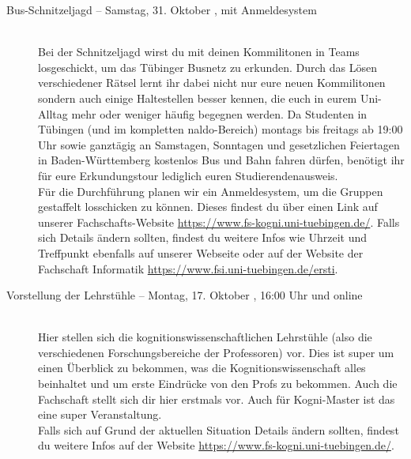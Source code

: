 \begin{description}
\ifkogwiss
\item[Bus-Schnitzeljagd -- Samstag, 31. Oktober \YEAR, mit Anmeldesystem]\ \\
    Bei der Schnitzeljagd wirst du mit deinen Kommilitonen in Teams losgeschickt, um das Tübinger Busnetz zu erkunden. Durch das Lösen verschiedener Rätsel lernt ihr dabei nicht nur eure neuen Kommilitonen sondern auch einige Haltestellen besser kennen, die euch in eurem Uni-Alltag mehr oder weniger häufig begegnen werden. Da Studenten in Tübingen (und im kompletten naldo-Bereich) montags bis freitags ab 19:00 Uhr sowie ganztägig an Samstagen, Sonntagen und gesetzlichen Feiertagen in Baden-Württemberg kostenlos Bus und Bahn fahren dürfen, benötigt ihr für eure Erkundungstour lediglich euren Studierendenausweis.\\
    Für die Durchführung planen wir ein Anmeldesystem, um die Gruppen gestaffelt losschicken zu können. Dieses findest du über einen Link auf unserer Fachschafts-Website \url{https://www.fs-kogni.uni-tuebingen.de/}.
    Falls sich Details ändern sollten, findest du weitere Infos wie Uhrzeit und Treffpunkt ebenfalls auf unserer Webseite oder auf der Website der Fachschaft Informatik \url{https://www.fsi.uni-tuebingen.de/ersti}.\\
\fi

\ifkogwiss
\item[Vorstellung der Lehrstühle -- Montag, 17. Oktober \YEAR, 16:00 Uhr und online]\ \\
    Hier stellen sich die kognitionswissenschaftlichen Lehrstühle (also die verschiedenen Forschungsbereiche der Professoren) vor. Dies ist super um einen Überblick zu bekommen, was die Kognitionswissenschaft alles beinhaltet und um erste Eindrücke von den Profs zu bekommen. Auch die Fachschaft stellt sich dir hier erstmals vor. %
    Auch für Kogni-Master ist das eine super Veranstaltung. \\
    Falls sich auf Grund der aktuellen Situation Details ändern sollten, findest du weitere Infos auf der Website \url{https://www.fs-kogni.uni-tuebingen.de/}.
    
\fi


\end{description}
